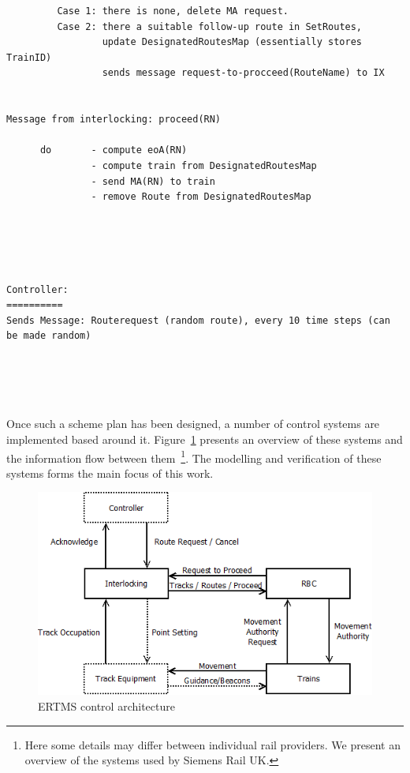 \begin{verbatim}
         Case 1: there is none, delete MA request.
         Case 2: there a suitable follow-up route in SetRoutes,
                 update DesignatedRoutesMap (essentially stores TrainID)
                 sends message request-to-procceed(RouteName) to IX 
 
        
Message from interlocking: proceed(RN)
      
      do       - compute eoA(RN)
               - compute train from DesignatedRoutesMap
               - send MA(RN) to train
               - remove Route from DesignatedRoutesMap

               
    
           

Controller:
==========
Sends Message: Routerequest (random route), every 10 time steps (can be made random)





\end{verbatim}



Once such a scheme plan has been designed, a number of control systems
are implemented based around it. Figure~\ref{fig:arch} presents an
overview of these systems and the information flow between
them~\footnote{Here some details may differ between individual rail
providers. We present an overview of the systems used by Siemens Rail
UK.}. The modelling and verification of these systems forms the main
focus of this work.

\begin{figure}[h]
\includegraphics[width=\linewidth]{Images/architecture.png}
\caption{ERTMS control architecture}
\label{fig:arch}
\end{figure}

